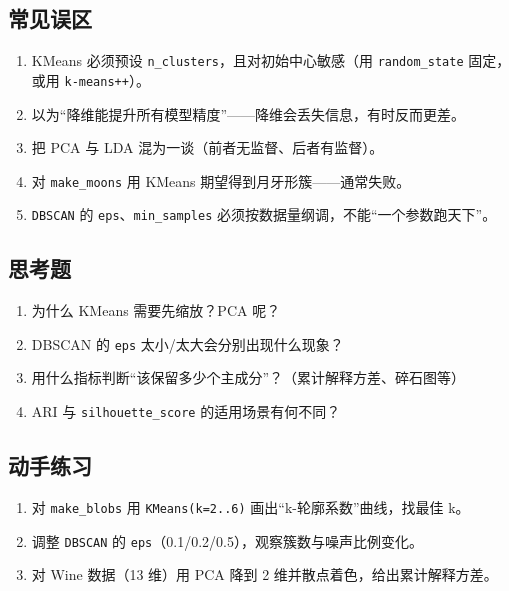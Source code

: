 \subsection{常见误区}\label{ux5e38ux89c1ux8befux533a-24}

\begin{enumerate}
\def\labelenumi{\arabic{enumi}.}
\tightlist
\item
  KMeans 必须预设 \texttt{n\_clusters}，且对初始中心敏感（用
  \texttt{random\_state} 固定，或用 \texttt{k-means++}）。
\item
  以为``降维能提升所有模型精度''------降维会丢失信息，有时反而更差。
\item
  把 PCA 与 LDA 混为一谈（前者无监督、后者有监督）。
\item
  对 \texttt{make\_moons} 用 KMeans 期望得到月牙形簇------通常失败。
\item
  \texttt{DBSCAN} 的 \texttt{eps}、\texttt{min\_samples}
  必须按数据量纲调，不能``一个参数跑天下''。
\end{enumerate}

\subsection{思考题}\label{ux601dux8003ux9898-26}

\begin{enumerate}
\def\labelenumi{\arabic{enumi}.}
\tightlist
\item
  为什么 KMeans 需要先缩放？PCA 呢？
\item
  DBSCAN 的 \texttt{eps} 太小/太大会分别出现什么现象？
\item
  用什么指标判断``该保留多少个主成分''？（累计解释方差、碎石图等）
\item
  ARI 与 \texttt{silhouette\_score} 的适用场景有何不同？
\end{enumerate}

\subsection{动手练习}\label{ux52a8ux624bux7ec3ux4e60-7}

\begin{enumerate}
\def\labelenumi{\arabic{enumi}.}
\tightlist
\item
  对 \texttt{make\_blobs} 用 \texttt{KMeans(k=2..6)}
  画出``k-轮廓系数''曲线，找最佳 k。
\item
  调整 \texttt{DBSCAN} 的
  \texttt{eps}（0.1/0.2/0.5），观察簇数与噪声比例变化。
\item
  对 Wine 数据（13 维）用 PCA 降到 2 维并散点着色，给出累计解释方差。
\end{enumerate}

